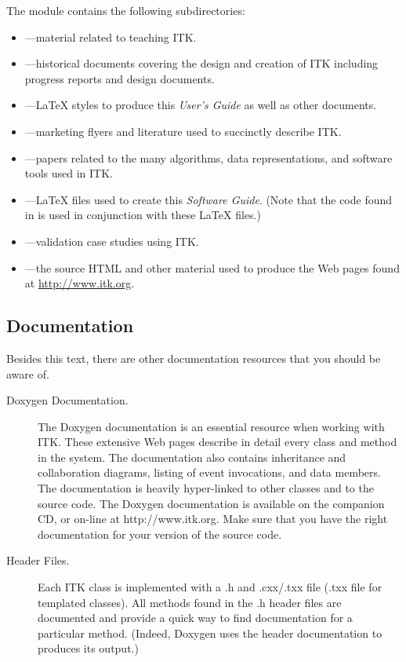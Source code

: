 The  module contains the following subdirectories:
\begin{itemize}
        \item {}---material related to
        teaching ITK.
        \item {}---historical documents covering
        the design and creation of ITK including progress reports and 
        design documents.
        \item {}---\LaTeX{} styles to produce this
        \emph{User's Guide} as well as other documents.
        \item {}---marketing flyers and 
        literature used to succinctly describe ITK.
        \item {}---papers related to the many
        algorithms, data representations, and software tools used in ITK.
        \item {}---\LaTeX{} files used to
        create this \emph{Software Guide}. (Note that the code found in
         is used in conjunction with these \LaTeX{}
        files.)
        \item {}---validation case studies
        using ITK.
        \item {}---the source HTML and other material
        used to produce the Web pages found at \url{http://www.itk.org}.
\end{itemize}

\subsection{Documentation}
\label{sec:Documentation}

Besides this text, there are other documentation resources that you should be
aware of.
\begin{description}
        \item[Doxygen Documentation.] The Doxygen documentation is an
        essential resource when working with ITK. These extensive Web pages
        describe in detail every class and method in the system. The
        documentation also contains inheritance and collaboration diagrams,
        listing of event invocations, and data members. The documentation is
        heavily hyper-linked to other classes and to the source code. The
        Doxygen documentation is available on the companion CD, or on-line at
        http://www.itk.org. Make sure that you have the right documentation
        for your version of the source code.

	\item[Header Files.] Each ITK class is implemented with a .h and
        .cxx/.txx file (.txx file for templated classes). All methods
        found in the .h header files are documented and provide a quick way
        to find documentation for a particular method. (Indeed, Doxygen uses
        the header documentation to produces its output.)
\end{description}

